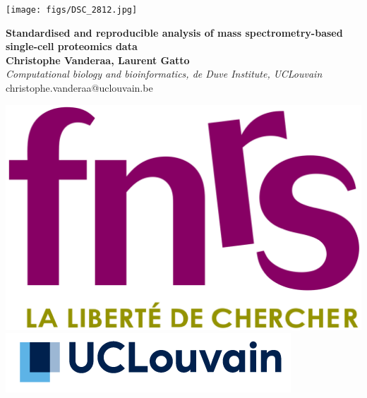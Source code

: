 \documentclass{article}
\title{}
\author{}
\date{}
\begin{document}


\begin{center}
\colorbox{lgray}{
  \begin{minipage}{3.7cm}
    \texttt{[image: figs/DSC\_2812.jpg]}
  \end{minipage}
  \begin{minipage}{.72\textwidth}
    \begin{center}
      \vspace{0.4cm}
      \huge 
      \hspace{1cm}
      \noindent
      \textbf{Standardised and reproducible analysis of mass 
        spectrometry-based single-cell proteomics data} \\
      \vspace{0.4cm}
      \Large \textbf{Christophe Vanderaa, Laurent Gatto} \\
      \Large \textit{Computational biology and bioinformatics, de Duve
        Institute, UCLouvain} \\
      \vspace{0.4cm}
      \normalsize christophe.vanderaa@uclouvain.be \\
      \hspace{1cm}
    \end{center}
  \end{minipage}
  \begin{minipage}{3.7cm}
      \includegraphics[width=0.7\linewidth, right]{figs/fnrs.png} \\
      \vspace{0.5cm}
      \includegraphics[width=1.1\linewidth, right]{figs/ucl.png}
  \end{minipage}
}
\end{center}
\end{document}
